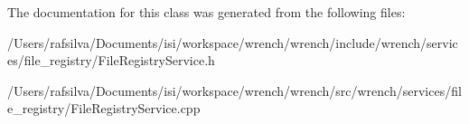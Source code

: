 The documentation for this class was generated from the following files\+:\begin{DoxyCompactItemize}
\item 
/\+Users/rafsilva/\+Documents/isi/workspace/wrench/wrench/include/wrench/services/file\+\_\+registry/File\+Registry\+Service.\+h\item 
/\+Users/rafsilva/\+Documents/isi/workspace/wrench/wrench/src/wrench/services/file\+\_\+registry/File\+Registry\+Service.\+cpp\end{DoxyCompactItemize}
